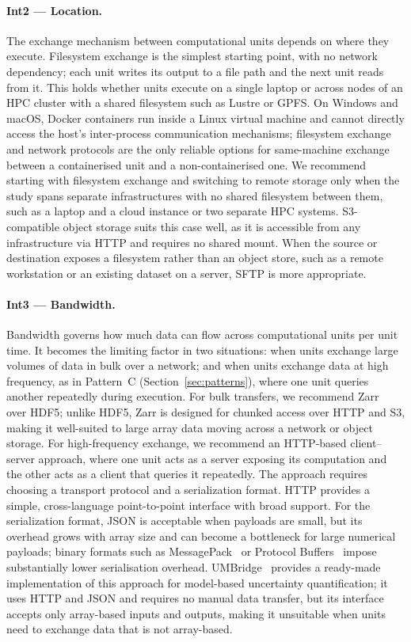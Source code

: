 \documentclass{eceasst}
\begin{document}
\paragraph{Int2 --- Location.}
The exchange mechanism between computational units depends on where they execute. Filesystem exchange is the
simplest starting point, with no network dependency; each
unit writes its output to a file path and the next unit reads from it.
This holds whether units execute on a single laptop or across nodes of an HPC
cluster with a shared filesystem such as Lustre or GPFS. On Windows and macOS,
Docker containers run inside a Linux virtual machine and cannot directly access
the host's inter-process communication mechanisms; filesystem exchange and
network protocols are the only reliable options for same-machine exchange between
a containerised unit and a non-containerised one. We recommend starting with filesystem exchange and
switching to remote storage
only when the study spans separate infrastructures with no shared
filesystem between them, such as a laptop and a cloud instance or two separate
HPC systems. S3-compatible object storage suits this case well, as
it is accessible from any infrastructure via HTTP and requires no shared mount.
When the source or destination exposes a filesystem rather than an object store,
such as a remote workstation or an existing dataset on a server,
SFTP is more appropriate.

\paragraph{Int3 --- Bandwidth.}
Bandwidth governs how much data can flow across computational units per unit time. It
becomes the limiting factor in two situations: when units exchange large volumes
of data in bulk over a network; and when units exchange data at high frequency,
as in Pattern~C (Section~\ref{sec:patterns}), where one unit queries another
repeatedly during execution. For bulk transfers, we recommend
Zarr~\cite{moore2023zarr} over HDF5; unlike HDF5, Zarr is designed for chunked
access over HTTP and S3, making it well-suited to large array data moving across
a network or object storage. For high-frequency exchange, we recommend an
HTTP-based client--server approach, where one unit acts as a server exposing
its computation and the other acts as a client that queries it repeatedly. The
approach requires choosing a transport protocol and a serialization format. HTTP
provides a simple, cross-language point-to-point interface with broad support.
For the serialization format, JSON is acceptable when payloads are small, but
its overhead grows with array size and can become a bottleneck for large
numerical payloads; binary formats such as MessagePack~\cite{messagepack} or Protocol Buffers~\cite{protobuf} impose substantially lower serialisation overhead. UMBridge~\cite{seelinger2023umbridge} provides a
ready-made implementation of this approach for model-based uncertainty
quantification; it uses HTTP and JSON and requires no manual data transfer, but
its interface accepts only array-based inputs and outputs, making it unsuitable
when units need to exchange data that is not array-based.
\end{document}
